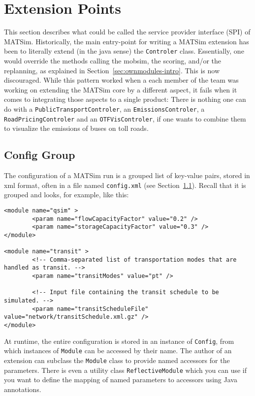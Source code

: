 \section{Extension Points}
\label{sec:matsim-spi}
This section describes what could be called the service provider interface (SPI) of MATSim.
Historically, the main entry-point for writing a MATSim extension has been to literally extend (in the \gls{java} sense)
the \lstinline|Controler| class. Essentially, one would override the methods calling the \gls{mobsim}, the scoring, and/or the replanning, as explained in Section~\ref{sec:ownmodules-intro}. This is now discouraged. While this pattern worked when a each member of the team was working on extending the MATSim core by a different aspect, it fails when it comes to
integrating those aspects to a single product: There is nothing one can do with a \lstinline|PublicTransportControler|, an \lstinline|EmissionsControler|, a \lstinline|RoadPricingControler| and an \lstinline|OTFVisControler|, if one wants to combine them to visualize the emissions of buses on toll roads.

\subsection{Config Group}
\label{sec:config}
The configuration of a MATSim run is a grouped list of key-value pairs, stored in \gls{xml} format, often in a file named \lstinline|config.xml| (see Section~\ref{sec:config}).
Recall that it is grouped and looks, for example, like this:

\begin{lstlisting}
<module name="qsim" >
		<param name="flowCapacityFactor" value="0.2" />
		<param name="storageCapacityFactor" value="0.3" />
</module>

<module name="transit" >
		<!-- Comma-separated list of transportation modes that are handled as transit. -->
		<param name="transitModes" value="pt" />

		<!-- Input file containing the transit schedule to be simulated. -->
		<param name="transitScheduleFile" value="network/transitSchedule.xml.gz" />
</module>
\end{lstlisting}

At runtime, the entire configuration is stored in an instance of \lstinline|Config|, from which instances of \lstinline|Module| can be accessed by their name.
The author of an extension can subclass the \lstinline|Module| class to provide named accessors for the parameters.
There is even a utility class \lstinline|ReflectiveModule| which you can use if you want to define the mapping of named parameters to accessors using Java annotations.

